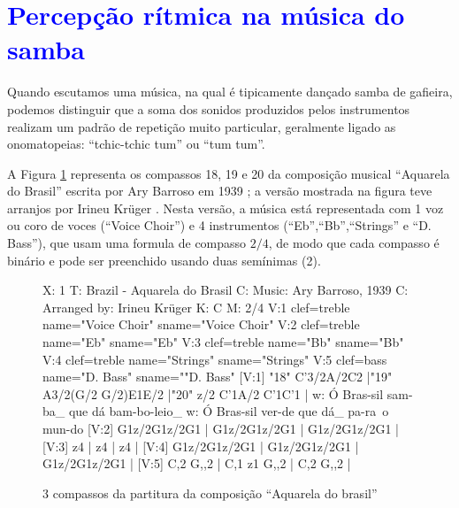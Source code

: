 \section{\textcolor{blue}{Percepção rítmica na música do samba}}
\label{sec:percepcaoouvinte}
Quando escutamos uma música, na qual é tipicamente dançado samba de gafieira,
podemos distinguir que a soma dos sonidos produzidos pelos instrumentos realizam 
um padrão de repetição muito particular, geralmente ligado as onomatopeias: ``tchic-tchic tum'' ou ``tum tum''.


A Figura \ref{fig:abc-caquarela} representa os compassos 18, 19 e 20 da  
composição musical ``Aquarela do Brasil'' escrita
por Ary Barroso em 1939 \cite{AquarelaDoBrasil}; 
a versão mostrada na figura teve arranjos por Irineu Krüger \cite{Irineu}. 
Nesta versão, a música está representada com 1 voz ou coro de voces (``Voice Choir'') e 4 
instrumentos (``Eb'',``Bb'',``Strings'' e ``D. Bass''), que usam uma 
formula de compasso $2/4$, de modo que cada compasso
é binário e
pode ser preenchido usando duas semínimas (2\quarternote).
\begin{figure}[ht]
\centering
\begin{abc}[name=abc-caquarela]
%
X: 1 %
T: Brazil - Aquarela do Brasil
C: Music: Ary Barroso, 1939
C: Arranged by: Irineu Krüger
K: C %
M: 2/4 %
%
V:1 clef=treble name="Voice Choir" sname="Voice Choir"
V:2 clef=treble name="Eb" sname="Eb"
V:3 clef=treble name="Bb" sname="Bb"
V:4 clef=treble name="Strings" sname="Strings"
V:5 clef=bass   name="D. Bass" sname=""D. Bass"
%
%
[V:1] "18" C'3/2A/2C2  |"19" A3/2(G/2 G/2)E1E/2  |"20" z/2 C'1A/2 C'1C'1  |
w:    Ó Bras-sil        sam-ba_ que dá       bam-bo-leio_ 
w:    Ó Bras-sil        ver-de que dá_       pa-ra~o mun-do 
%
%
[V:2] G1z/2G1z/2G1  | G1z/2G1z/2G1  | G1z/2G1z/2G1  |
%
%
[V:3] z4  | z4  | z4  |
%
%
[V:4] G1z/2G1z/2G1  | G1z/2G1z/2G1  | G1z/2G1z/2G1  |
%
%
[V:5] C,2 G,,2  | C,1 z1 G,,2  | C,2 G,,2  |
\end{abc}
\caption{3 compassos da partitura da composição ``Aquarela do brasil''}
\label{fig:abc-caquarela}
\end{figure}

